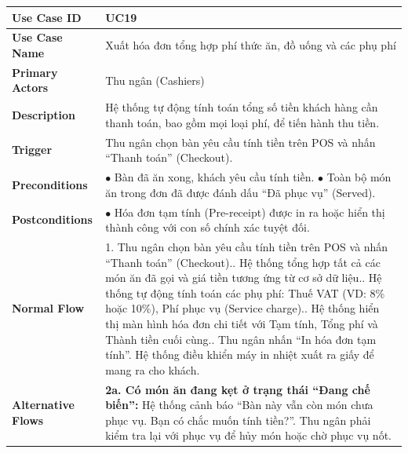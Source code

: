 \begin{longtable}{|L{3.5cm}|L{12.5cm}|}
\hline
\textbf{Use Case ID} & UC19 \\ \hline
\textbf{Use Case Name} & Xuất hóa đơn tổng hợp phí thức ăn, đồ uống và các phụ phí \\ \hline
\textbf{Primary Actors} & Thu ngân (Cashiers) \\ \hline
\textbf{Description} & Hệ thống tự động tính toán tổng số tiền khách hàng cần thanh toán, bao gồm mọi loại phí, để tiến hành thu tiền. \\ \hline
\textbf{Trigger} & Thu ngân chọn bàn yêu cầu tính tiền trên POS và nhấn ``Thanh toán'' (Checkout). \\ \hline
\textbf{Preconditions} &
$\bullet$ Bàn đã ăn xong, khách yêu cầu tính tiền.\newline
$\bullet$ Toàn bộ món ăn trong đơn đã được đánh dấu ``Đã phục vụ'' (Served). \\ \hline
\textbf{Postconditions} & $\bullet$ Hóa đơn tạm tính (Pre-receipt) được in ra hoặc hiển thị thành công với con số chính xác tuyệt đối. \\ \hline
\textbf{Normal Flow} &
1. Thu ngân chọn bàn yêu cầu tính tiền trên POS và nhấn ``Thanh toán'' (Checkout).. Hệ thống tổng hợp tất cả các món ăn đã gọi và giá tiền tương ứng từ cơ sở dữ liệu.. Hệ thống tự động tính toán các phụ phí: Thuế VAT (VD: 8\% hoặc 10\%), Phí phục vụ (Service charge).. Hệ thống hiển thị màn hình hóa đơn chi tiết với Tạm tính, Tổng phí và Thành tiền cuối cùng.. Thu ngân nhấn ``In hóa đơn tạm tính''. Hệ thống điều khiển máy in nhiệt xuất ra giấy để mang ra cho khách. \\ \hline
\textbf{Alternative Flows} &
\textbf{2a. Có món ăn đang kẹt ở trạng thái ``Đang chế biến'':} Hệ thống cảnh báo ``Bàn này vẫn còn món chưa phục vụ. Bạn có chắc muốn tính tiền?''. Thu ngân phải kiểm tra lại với phục vụ để hủy món hoặc chờ phục vụ nốt. \\ \hline
\end{longtable}

